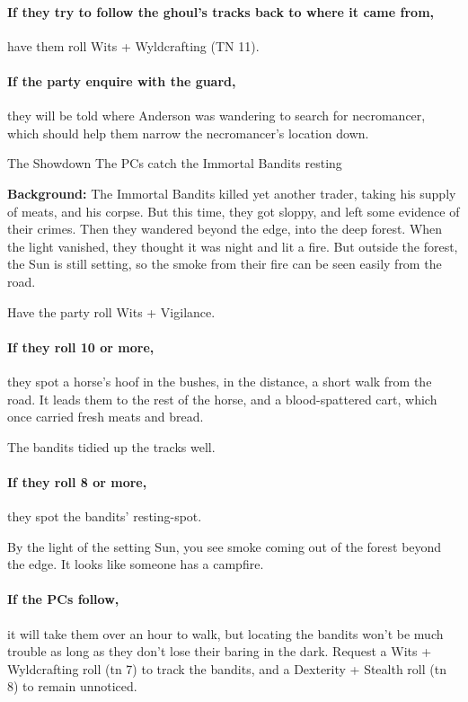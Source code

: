 
\paragraph{If they try to follow the ghoul's tracks back to where it came from,}
have them roll Wits + Wyldcrafting (TN 11).

\paragraph{If the party enquire with the \gls{guard},}
they will be told where Anderson was wandering to search for \gls{necromancer}, which should help them narrow the necromancer's location down.

{The Showdown}%
{The PCs catch the Immortal Bandits resting}%

\textbf{Background:}
The Immortal Bandits killed yet another trader, taking his supply of meats, and his corpse.
But this time, they got sloppy, and left some evidence of their crimes.
Then they wandered beyond the \gls{edge}, into the deep forest.
When the light vanished, they thought it was night and lit a fire.
But outside the forest, the Sun is still setting, so the smoke from their fire can be seen easily from the road.

Have the party roll Wits + Vigilance.

\paragraph{If they roll 10 or more,}
they spot a horse's hoof in the bushes, in the distance, a short walk from the road.
It leads them to the rest of the horse, and a blood-spattered cart, which once carried fresh meats and bread.

The bandits tidied up the tracks well.

\paragraph{If they roll 8 or more,}
they spot the bandits' resting-spot.

\begin{boxtext}
  By the light of the setting Sun, you see smoke coming out of the forest beyond the \gls{edge}.
  It looks like someone has a campfire.
\end{boxtext}

\paragraph{If the PCs follow,}
it will take them over an hour to walk, but locating the bandits won't be much trouble as long as they don't lose their baring in the dark.
Request a Wits + Wyldcrafting roll (\gls{tn} 7) to track the bandits, and a Dexterity + Stealth roll (\gls{tn} 8) to remain unnoticed.


